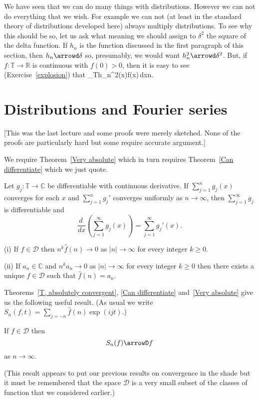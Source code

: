 We have seen that we can do many things with distributions.
However we can not do everything that we wish. For example
we can not (at least in the standard theory of distributions
developed here) always multiply distributions. To see why
this should be so, let us ask what meaning we should
assign to $\delta^{2}$ the square of the delta function.
If $h_{n}$ is the function discussed in the first paragraph
of this section, then $h_{n}\arrowd \delta$ so, presumably,
we would want $h_{n}^{2}\arrowd \delta^{2}$. But, if
$f:{\mathbb T}\rightarrow{\mathbb R}$ is continuous
with $f(0)>0$, then
it is easy to see (Exercise~\ref{explosion}) that
\be
\int_{\mathbb T}h_{n}^{2}(x)f(x)\,dx\rightarrow\infty\quad\quad {}n\to\infty.
\ee

\section{Distributions and Fourier series}
[This was the last lecture and some proofs were merely sketched.
None of the proofs are particularly hard but some require
accurate argument.]

We require Theorem~\ref{Very absolute} which in turn requires Theorem~\ref{Can differentiate} which we just quote.

\begin{theorem}\label{Can differentiate}
Let $g_{j}:{\mathbb T}\rightarrow{\mathbb C}$ be differentiable
with continuous derivative. If $\sum_{j=1}^{n}g_{j}(x)$
converges for each $x$ and
$\sum_{j=1}^{n}g_{j}'$ converges uniformly as
$n\rightarrow\infty$, then $\sum_{j=1}^{\infty}g_{j}$ is
differentiable and
\[\frac{d\ }{dx}\left(\sum_{j=1}^{\infty}g_{j}(x)\right)
=\sum_{j=1}^{\infty}g_{j}'(x).\]
\end{theorem}
\begin{theorem}\label{Very absolute}
(i) If $f\in{\mathcal D}$ then $n^{k}\hat{f}(n)\rightarrow 0$
as $|n|\rightarrow\infty$ for every integer $k\geq 0$.

(ii) If $a_{n}\in{\mathbb C}$ and $n^{k}a_{n}\rightarrow 0$ as $|n|\rightarrow\infty$ for every integer $k\geq 0$ then there exists a unique $f\in{\mathcal D}$ such that $\hat{f}(n)=a_{n}$.
\end{theorem}

Theorems~\ref{T, absolutely convergent},
\ref{Can differentiate} and~\ref{Very absolute}
give us the following useful result.
(As usual we write $S_{n}(f,t)=\sum_{j=-n}\hat{f}(n)\exp (ijt)$.)
\begin{lemma}\label{Fourier sum distribution}
If $f\in{\mathcal D}$ then
\[S_{n}(f)\arrowD f\]
as $n\rightarrow\infty$.
\end{lemma}
(This result appears to put our previous results on
convergence in the shade but it must be remembered
that the space ${\mathcal D}$ is a very small subset
of the classes of function that we considered earlier.)

